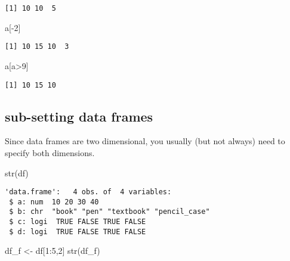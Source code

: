 \documentclass[
  letterpaper,
  DIV=11,
  numbers=noendperiod]{scrreprt}
\newenvironment{Shaded}{\begin{snugshade}}{\end{snugshade}}
\newcommand{\DecValTok}[1]{\textcolor[rgb]{0.68,0.00,0.00}{#1}}
\newcommand{\FunctionTok}[1]{\textcolor[rgb]{0.28,0.35,0.67}{#1}}
\newcommand{\NormalTok}[1]{\textcolor[rgb]{0.00,0.23,0.31}{#1}}
\newcommand{\OtherTok}[1]{\textcolor[rgb]{0.00,0.23,0.31}{#1}}
\newcommand{\SpecialCharTok}[1]{\textcolor[rgb]{0.37,0.37,0.37}{#1}}
\begin{document}
\begin{verbatim}
[1] 10 10  5
\end{verbatim}

\begin{Shaded}
\begin{Highlighting}[]
\NormalTok{a[}\SpecialCharTok{{-}}\DecValTok{2}\NormalTok{]}
\end{Highlighting}
\end{Shaded}

\begin{verbatim}
[1] 10 15 10  3
\end{verbatim}

\begin{Shaded}
\begin{Highlighting}[]
\NormalTok{a[a}\SpecialCharTok{\textgreater{}}\DecValTok{9}\NormalTok{]}
\end{Highlighting}
\end{Shaded}

\begin{verbatim}
[1] 10 15 10
\end{verbatim}

\subsection{sub-setting data frames}\label{sub-setting-data-frames}

Since data frames are two dimensional, you usually (but not always) need
to specify both dimensions.

\begin{Shaded}
\begin{Highlighting}[]
\FunctionTok{str}\NormalTok{(df)}
\end{Highlighting}
\end{Shaded}

\begin{verbatim}
'data.frame':   4 obs. of  4 variables:
 $ a: num  10 20 30 40
 $ b: chr  "book" "pen" "textbook" "pencil_case"
 $ c: logi  TRUE FALSE TRUE FALSE
 $ d: logi  TRUE FALSE TRUE FALSE
\end{verbatim}

\begin{Shaded}
\begin{Highlighting}[]
\NormalTok{df\_f }\OtherTok{\textless{}{-}}\NormalTok{ df[}\DecValTok{1}\SpecialCharTok{:}\DecValTok{5}\NormalTok{,}\DecValTok{2}\NormalTok{]}
\FunctionTok{str}\NormalTok{(df\_f)}
\end{Highlighting}
\end{Shaded}
\end{document}
